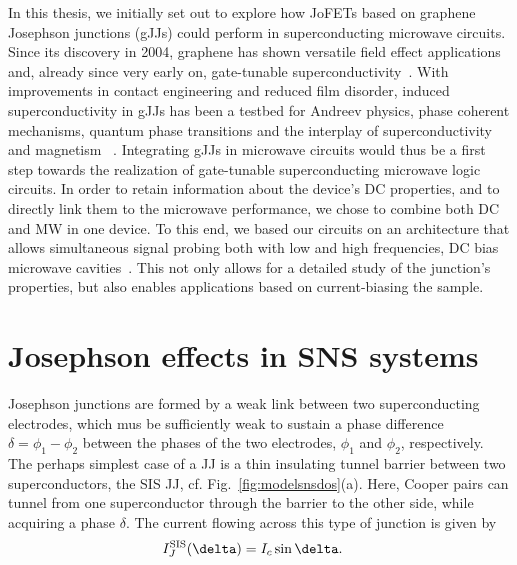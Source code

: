 In this thesis, we initially set out to explore how JoFETs based on graphene Josephson junctions (gJJs) could perform in superconducting microwave circuits.
%
Since its discovery in 2004, graphene has shown versatile field effect applications and, already since very early on, gate-tunable superconductivity~\cite{novoselovElectricFieldEffect2004c,heerscheBipolarSupercurrentGraphene2007a}.
%
With improvements in contact engineering and reduced film disorder, induced superconductivity in gJJs has been a testbed for Andreev physics, phase coherent mechanisms, quantum phase transitions and the interplay of superconductivity and magnetism ~\cite{leeProximityCouplingSuperconductorgraphene2018a}.
%
Integrating gJJs in microwave circuits would thus be a first step towards the realization of gate-tunable superconducting microwave logic circuits.
%
In order to retain information about the device's DC properties, and to directly link them to the microwave performance, we chose to combine both DC and MW in one device.
%
To this end, we based our circuits on an architecture that allows simultaneous signal probing both with low and high frequencies, DC bias microwave cavities~\cite{bosmanBroadbandArchitectureGalvanically2015c}.
%
This not only allows for a detailed study of the junction's properties, but also enables applications based on current-biasing the sample.







\section{Josephson effects in SNS systems}

Josephson junctions are formed by a weak link between two superconducting electrodes, which mus be sufficiently weak to sustain a phase difference $\delta=\phi_1-\phi_2$ between the phases of the two electrodes, $\phi_1$ and $\phi_2$, respectively.
%
The perhaps simplest case of a JJ is a thin insulating tunnel barrier between two superconductors, the SIS JJ, cf. Fig.~\ref{fig:modelsnsdos}(a).
%
Here, Cooper pairs can tunnel from one superconductor through the barrier to the other side, while acquiring a phase $\delta$.
%
The current flowing across this type of junction is given by
%
\begin{align}
I_J^{\rm SIS}(\delta) &= I_c\sin\delta.
\end{align}

